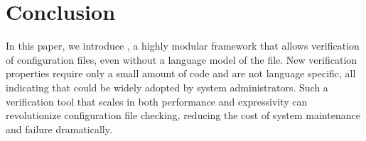 
\section{Conclusion}

In this paper, we introduce \app, a highly modular framework 
that allows verification of configuration files, 
even without a language model of the file.
New verification properties require only a small amount of code 
and are not language specific, 
all indicating that \app could be widely adopted by system administrators.
Such a verification tool that scales in both performance and expressivity 
can revolutionize configuration file checking, 
reducing the cost of system maintenance and failure dramatically.
